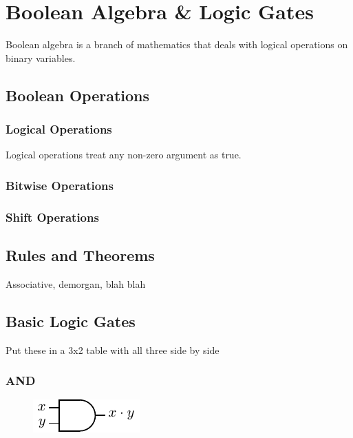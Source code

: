 \chapter{Boolean Algebra \& Logic Gates}

Boolean algebra is a branch of mathematics that deals with logical operations on binary variables.

\section{Boolean Operations}

\subsection{Logical Operations}

Logical operations treat any non-zero argument as true.

\subsection{Bitwise Operations}

\subsection{Shift Operations}

\section{Rules and Theorems}

Associative, demorgan, blah blah

\section{Basic Logic Gates}

Put these in a 3x2 table with all three side by side

\subsection{AND}

\begin{figure}[h!]
	\includegraphics{./img/and.png}
\end{figure}

